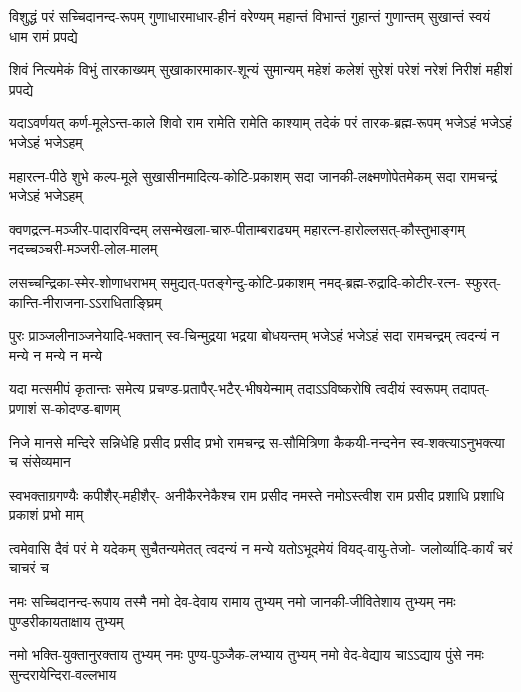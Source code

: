 

\fourlineindentedshloka
{विशुद्धं परं सच्चिदानन्द-रूपम्}
{गुणाधारमाधार-हीनं वरेण्यम्}
{महान्तं विभान्तं गुहान्तं गुणान्तम्}
{सुखान्तं स्वयं धाम रामं प्रपद्ये}%

\fourlineindentedshloka
{शिवं नित्यमेकं विभुं तारकाख्यम्}
{सुखाकारमाकार-शून्यं सुमान्यम्}
{महेशं कलेशं सुरेशं परेशं}
{नरेशं निरीशं महीशं प्रपद्ये}%

\fourlineindentedshloka
{यदाऽवर्णयत् कर्ण-मूलेऽन्त-काले}
{शिवो राम रामेति रामेति काश्याम्}
{तदेकं परं तारक-ब्रह्म-रूपम्}
{भजेऽहं भजेऽहं भजेऽहं भजेऽहम्}%

\fourlineindentedshloka
{महारत्न-पीठे शुभे कल्प-मूले}
{सुखासीनमादित्य-कोटि-प्रकाशम्}
{सदा जानकी-लक्ष्मणोपेतमेकम्}
{सदा रामचन्द्रं भजेऽहं भजेऽहम्}%

\fourlineindentedshloka
{क्वणद्रत्न-मञ्जीर-पादारविन्दम्}
{लसन्मेखला-चारु-पीताम्बराढ्यम्}
{महारत्न-हारोल्लसत्-कौस्तुभाङ्गम्}
{नदच्चञ्चरी-मञ्जरी-लोल-मालम्}%

\fourlineindentedshloka
{लसच्चन्द्रिका-स्मेर-शोणाधराभम्}
{समुद्यत्-पतङ्गेन्दु-कोटि-प्रकाशम्}
{नमद्-ब्रह्म-रुद्रादि-कोटीर-रत्न-}
{स्फुरत्-कान्ति-नीराजना-ऽऽराधिताङ्घ्रिम्}%

\fourlineindentedshloka
{पुरः प्राञ्जलीनाञ्जनेयादि-भक्तान्}
{स्व-चिन्मुद्रया भद्रया बोधयन्तम्}
{भजेऽहं भजेऽहं सदा रामचन्द्रम्}
{त्वदन्यं न मन्ये न मन्ये न मन्ये}%

\fourlineindentedshloka
{यदा मत्समीपं कृतान्तः समेत्य}
{प्रचण्ड-प्रतापैर्-भटैर्-भीषयेन्माम्}
{तदाऽऽविष्करोषि त्वदीयं स्वरूपम्}
{तदापत्-प्रणाशं स-कोदण्ड-बाणम्}%

\fourlineindentedshloka
{निजे मानसे मन्दिरे सन्निधेहि}
{प्रसीद प्रसीद प्रभो रामचन्द्र}
{स-सौमित्रिणा कैकयी-नन्दनेन}
{स्व-शक्त्याऽनुभक्त्या च संसेव्यमान}%

\fourlineindentedshloka
{स्वभक्ताग्रगण्यैः कपीशैर्-महीशैर्-}
{अनीकैरनेकैश्च राम प्रसीद}
{नमस्ते नमोऽस्त्वीश राम प्रसीद}
{प्रशाधि प्रशाधि प्रकाशं प्रभो माम्}%

\fourlineindentedshloka
{त्वमेवासि दैवं परं मे यदेकम्}
{सुचैतन्यमेतत् त्वदन्यं न मन्ये}
{यतोऽभूदमेयं वियद्-वायु-तेजो-}
{जलोर्व्यादि-कार्यं चरं चाचरं च}%

\fourlineindentedshloka
{नमः सच्चिदानन्द-रूपाय तस्मै}
{नमो देव-देवाय रामाय तुभ्यम्}
{नमो जानकी-जीवितेशाय तुभ्यम्}
{नमः पुण्डरीकायताक्षाय तुभ्यम्}%

\fourlineindentedshloka
{नमो भक्ति-युक्तानुरक्ताय तुभ्यम्}
{नमः पुण्य-पुञ्जैक-लभ्याय तुभ्यम्}
{नमो वेद-वेद्याय चाऽऽद्याय पुंसे}
{नमः सुन्दरायेन्दिरा-वल्लभाय}%

